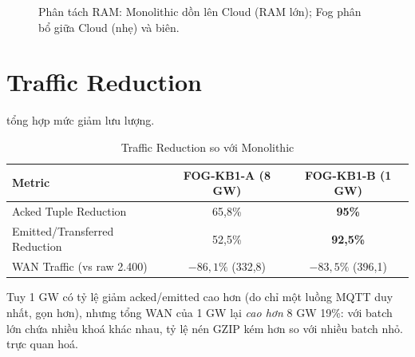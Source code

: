 \documentclass[13pt,a4paper]{report}
\begin{document}
\begin{figure}[H]
\centering
{}
\caption{Phân tách RAM: Monolithic dồn lên Cloud (RAM lớn); Fog phân bổ giữa Cloud (nhẹ) và biên.}
\label{fig:ram-breakdown}
\end{figure}

\section{Traffic Reduction}

 tổng hợp mức giảm lưu lượng.

\begin{table}[H]
\centering
\caption{Traffic Reduction so với Monolithic}
\label{tab:traffic-reduction}
\small
\begin{tabular}{p{} c c}
\toprule
\textbf{Metric} & \textbf{FOG-KB1-A (8 GW)} & \textbf{FOG-KB1-B (1 GW)} \\
\midrule
Acked Tuple Reduction          & 65,8\%  & \textbf{95\%} \\
Emitted/Transferred Reduction  & 52,5\%  & \textbf{92,5\%} \\
WAN Traffic (vs raw 2.400)     & \textbf{$-86,1\%$} (332,8) & $-83,5\%$ (396,1) \\
\bottomrule
\end{tabular}
\end{table}

Tuy 1 GW có tỷ lệ giảm acked/emitted cao hơn (do chỉ một luồng MQTT duy nhất,
gọn hơn), nhưng tổng WAN của 1 GW lại \textit{cao hơn} 8 GW 19\%: với batch lớn
chứa nhiều khoá khác nhau, tỷ lệ nén GZIP kém hơn so với nhiều batch nhỏ.
 trực quan hoá.
\end{document}
